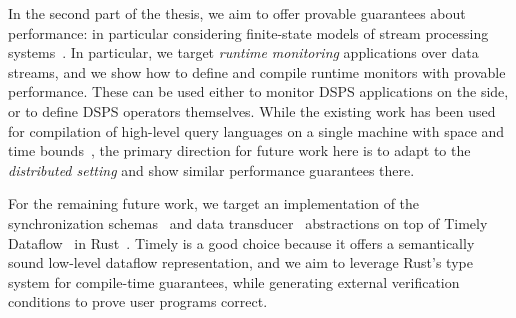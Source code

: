 In the second part of the thesis, we aim to offer provable guarantees about performance: in particular considering finite-state models of stream processing systems~.
In particular, we target \emph{runtime monitoring} applications
over data streams, and we show how to define and compile runtime monitors
with provable performance.
These can be used either to monitor DSPS applications on the side,
or to define DSPS operators themselves.
While the existing work has been used for compilation of high-level query languages on a single machine with space and time bounds~\cite{popl19,QRE,StreamQRE},
the primary direction for future work here is to adapt to the \emph{distributed setting} and show similar performance guarantees there.

For the remaining future work, we target an implementation of the synchronization schemas~ and data transducer~ abstractions on top of Timely Dataflow~\cite{Timely,Naiad2013} in Rust~\cite{RustLang}.
Timely is a good choice because it offers a semantically sound low-level dataflow representation,
and we aim to leverage Rust's type system for compile-time guarantees,
while generating external verification conditions to prove user programs correct.


